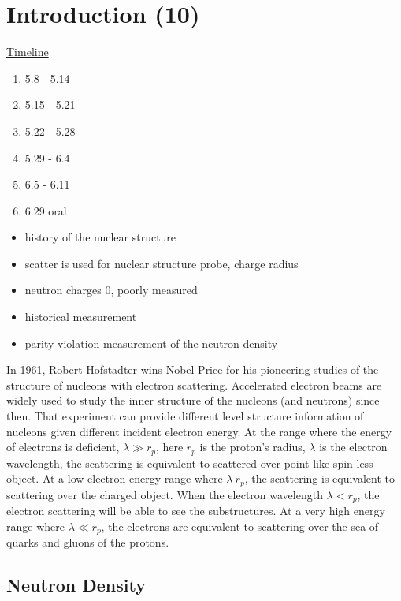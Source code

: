 \chapter{Introduction (10)}

\href{https://docs.google.com/spreadsheets/d/1sSxj0pFhz2N5CeNrXt-o7Ybs_TAdTg6Rkz5J-D-VANc/edit?usp=sharing}{Timeline}

\begin{enumerate}
    \item 5.8  - 5.14
    \item 5.15 - 5.21
    \item 5.22 - 5.28
    \item 5.29 - 6.4
    \item 6.5  - 6.11
    \item 6.29 oral
\end{enumerate}



\begin{itemize}
    \item history of the nuclear structure
    \item scatter is used for nuclear structure probe, charge radius 
    \item neutron charges 0, poorly measured
    \item historical measurement 
    \item parity violation measurement of the neutron density
\end{itemize} 

In 1961, Robert Hofstadter wins Nobel Price for his pioneering studies of the structure of nucleons with  electron scattering. Accelerated electron beams are widely used to study the inner structure of the nucleons (and neutrons) since then. That experiment can provide different level structure information of nucleons given different incident electron energy. At the range where the energy of electrons is deficient, $\lambda \gg r_p$, here $r_p$ is the proton's radius, $\lambda$ is the electron wavelength, the scattering is equivalent to scattered over point like spin-less object. At a low electron energy range where $\lambda ~r_p$, the scattering is equivalent to scattering over the charged object. When the electron wavelength $\lambda < r_p$, the electron scattering will be able to see the substructures. At a very high energy range where $\lambda \ll r_p$, the electrons are equivalent to scattering over the sea of quarks and gluons of the protons. 

\section{Neutron Density}
